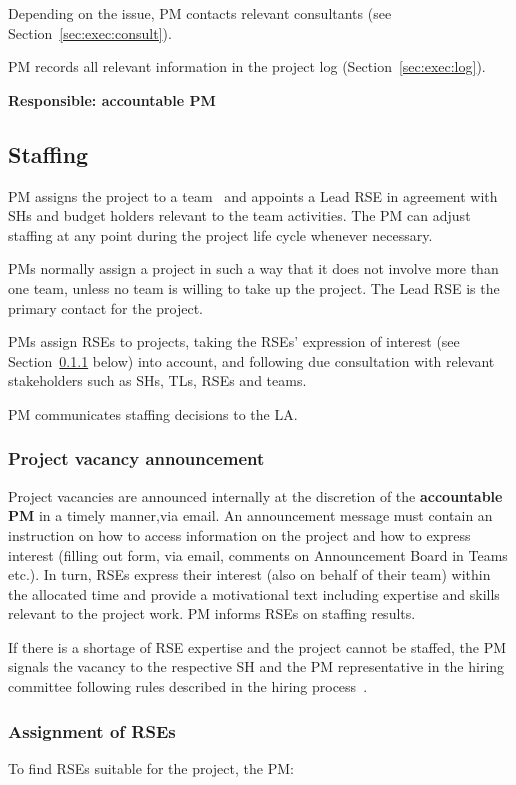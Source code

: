 Depending on the issue, PM contacts relevant consultants (see Section~\ref{sec:exec:consult}).

PM records all relevant information in the project log (Section~\ref{sec:exec:log}).

\textbf{Responsible: accountable PM}



\subsection{Staffing}
PM assigns the project to a team~\cite{rse-teams} and appoints a Lead RSE in agreement with SHs and budget
holders relevant to the team activities. The PM can adjust staffing at any point during the project life cycle
whenever necessary.

PMs normally assign a project in such a way that it does not involve more than one team, unless no team is willing to
take up the project. The Lead RSE is the primary contact for the project.

PMs assign RSEs to projects, taking the RSEs' expression of interest (see Section~\ref{sec:init:vacancy} below) into account, and following due consultation with relevant stakeholders such as SHs,
TLs, RSEs and teams. 

PM communicates staffing decisions to the LA. 

\subsubsection{Project vacancy announcement}
\label{sec:init:vacancy}
Project vacancies are announced internally at the discretion of the \textbf{accountable PM} in a timely manner,via email. An announcement message must contain an instruction on how to access information on the project and how to
express interest (filling out form, via email, comments on Announcement Board in Teams etc.). In turn, RSEs express
their interest (also on behalf of their team) within the allocated time and provide a motivational text including
expertise and skills relevant to the project work. PM informs RSEs on staffing results.

If there is a shortage of RSE expertise and the project cannot be staffed, the PM signals the vacancy to the respective
SH and the PM representative in the hiring committee following rules described in the hiring process~\cite{hiring-intranet}.


\subsubsection{Assignment of RSEs}
To find RSEs suitable for the project, the PM:


